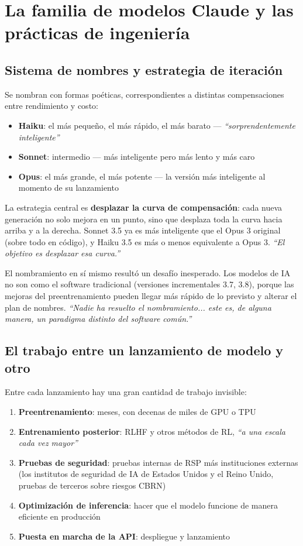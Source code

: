 \section{La familia de modelos Claude y las prácticas de ingeniería}

\subsection{Sistema de nombres y estrategia de iteración}

Se nombran con formas poéticas, correspondientes a distintas compensaciones entre rendimiento y costo:
\begin{itemize}
    \item \textbf{Haiku}: el más pequeño, el más rápido, el más barato — \textit{``sorprendentemente inteligente''}
    \item \textbf{Sonnet}: intermedio — más inteligente pero más lento y más caro
    \item \textbf{Opus}: el más grande, el más potente — la versión más inteligente al momento de su lanzamiento
\end{itemize}

La estrategia central es \textbf{desplazar la curva de compensación}: cada nueva generación no solo mejora en un punto, sino que desplaza toda la curva hacia arriba y a la derecha. Sonnet 3.5 ya es más inteligente que el Opus 3 original (sobre todo en código), y Haiku 3.5 es más o menos equivalente a Opus 3. \textit{``El objetivo es desplazar esa curva.''}

El nombramiento en sí mismo resultó un desafío inesperado. Los modelos de IA no son como el software tradicional (versiones incrementales 3.7, 3.8), porque las mejoras del preentrenamiento pueden llegar más rápido de lo previsto y alterar el plan de nombres. \textit{``Nadie ha resuelto el nombramiento... este es, de alguna manera, un paradigma distinto del software común.''}

\subsection{El trabajo entre un lanzamiento de modelo y otro}

Entre cada lanzamiento hay una gran cantidad de trabajo invisible:

\begin{enumerate}
    \item \textbf{Preentrenamiento}: meses, con decenas de miles de GPU o TPU
    \item \textbf{Entrenamiento posterior}: RLHF y otros métodos de RL, \textit{``a una escala cada vez mayor''}
    \item \textbf{Pruebas de seguridad}: pruebas internas de RSP más instituciones externas (los institutos de seguridad de IA de Estados Unidos y el Reino Unido, pruebas de terceros sobre riesgos CBRN)
    \item \textbf{Optimización de inferencia}: hacer que el modelo funcione de manera eficiente en producción
    \item \textbf{Puesta en marcha de la API}: despliegue y lanzamiento
\end{enumerate}

